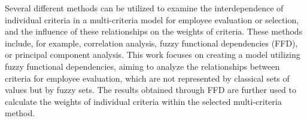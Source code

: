 
\begin{Abstrakt}
    Several different methods can be utilized to examine the interdependence of individual criteria in a multi-criteria model for employee evaluation or selection, and the influence of these relationships on the weights of criteria. These methods include, for example, correlation analysis, fuzzy functional dependencies (FFD), or principal component analysis. This work focuses on creating a model utilizing fuzzy functional dependencies, aiming to analyze the relationships between criteria for employee evaluation, which are not represented by classical sets of values but by fuzzy sets. The results obtained through FFD are further used to calculate the weights of individual criteria within the selected multi-criteria method.
\end{Abstrakt}



\clearpage